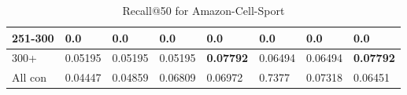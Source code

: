 \begin{table*}[]
\begin{tabular}{|l|l|l|l|l|l|l||l|}
        251-300     & 0.0                            & 0.0                            & 0.0                            & 0.0                            & 0.0                            & 0.0                             & 0.0                        \\ \hline
        300+        & 0.05195                        & 0.05195                        & 0.05195                        & \textbf{0.07792}               & 0.06494                        & 0.06494                         & \textbf{0.07792}           \\ \hline
        All con     & 0.04447                        & 0.04859                        & 0.06809                        & 0.06972                        & 0.7377                         & 0.07318                         & 0.06451                    \\ \hline
    \end{tabular}
    \caption{Recall@50 for Amazon-Cell-Sport}
    \label{tab:Amazon-Cell-Sport-recall-evaluation}
\end{table*}